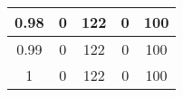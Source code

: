 \begin{table}[H]
\begin{tabular}{ccccc}
    \multicolumn{1}{|c|}{0.98}                              & \multicolumn{1}{c|}{0}                     & \multicolumn{1}{c|}{122}                   & \multicolumn{1}{c|}{0}                     & \multicolumn{1}{c|}{100}                   \\ \hline
    \multicolumn{1}{|c|}{0.99}                              & \multicolumn{1}{c|}{0}                     & \multicolumn{1}{c|}{122}                   & \multicolumn{1}{c|}{0}                     & \multicolumn{1}{c|}{100}                   \\ \hline
    \multicolumn{1}{|c|}{1}                                 & \multicolumn{1}{c|}{0}                     & \multicolumn{1}{c|}{122}                   & \multicolumn{1}{c|}{0}                     & \multicolumn{1}{c|}{100}                   \\ \hline
    \end{tabular}
    \label{tab:example-generated}
    \end{table}
